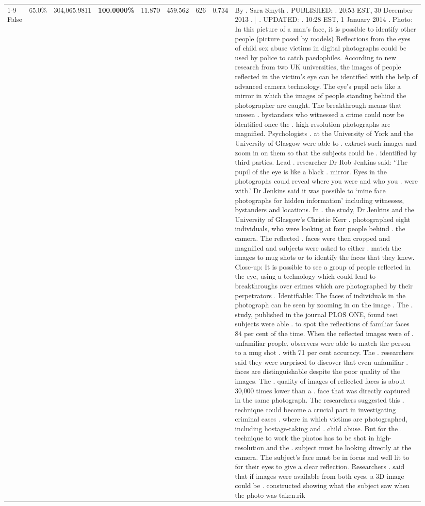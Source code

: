 \begin{table}[H]
\begin{tabular}{lllrlllll}
\cline{1-9}
False & 65.0\% & \color{red} 304,065.9811 & \bfseries \color{red} 100.0000\% & 11.870 & 459.562 & 626 & 0.734 & By . Sara Smyth . PUBLISHED: . 20:53 EST, 30 December 2013 . | . UPDATED: . 10:28 EST, 1 January 2014 . Photo: In this picture of a man's face, it is possible to identify other people (picture posed by models) Reflections from the eyes of child sex abuse victims in digital photographs could be used by police to catch paedophiles. According to new research from two UK universities, the images of people reflected in the victim's eye can be identified with the help of advanced camera technology. The eye's pupil acts like a mirror in which the images of people standing behind the photographer are caught. The breakthrough means that unseen . bystanders who witnessed a crime could now be identified once the . high-resolution photographs are magnified. Psychologists . at the University of York and the University of Glasgow were able to . extract such images and zoom in on them so that the subjects could be . identified by third parties. Lead . researcher Dr Rob Jenkins said: ‘The pupil of the eye is like a black . mirror. Eyes in the photographs could reveal where you were and who you . were with.' Dr Jenkins said it was possible to ‘mine face photographs for hidden information' including witnesses, bystanders and locations. In . the study, Dr Jenkins and the University of Glasgow's Christie Kerr . photographed eight individuals, who were looking at four people behind . the camera. The reflected . faces were then cropped and magnified and subjects were asked to either . match the images to mug shots or to identify the faces that they knew. Close-up: It is possible to see a group of people reflected in the eye, using a technology which could lead to breakthroughs over crimes which are photographed by their perpetrators . Identifiable: The faces of individuals in the photograph can be seen by zooming in on the image . The . study, published in the journal PLOS ONE, found test subjects were able . to spot the reflections of familiar faces 84 per cent of the time. When the reflected images were of . unfamiliar people, observers were able to match the person to a mug shot . with 71 per cent accuracy. The . researchers said they were surprised to discover that even unfamiliar . faces are distinguishable despite the poor quality of the images. The . quality of images of reflected faces is about 30,000 times lower than a . face that was directly captured in the same photograph. The researchers suggested this . technique could become a crucial part in investigating criminal cases . where in which victims are photographed, including hostage-taking and . child abuse. But for the . technique to work the photos has to be shot in high-resolution and the . subject must be looking directly at the camera. The subject's face must be in focus and well lit to for their eyes to give a clear reflection. Researchers . said that if images were available from both eyes, a 3D image could be . constructed showing what the subject saw when the photo was taken.rik \\

\end{tabular}
\end{table}
